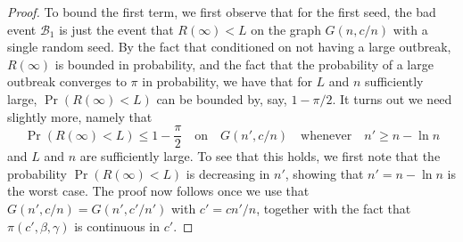 \documentclass[11pt]{article}
\begin{document}
\begin{proof}
  
To bound the first term, we
first observe that for the first seed, the bad event $\mathcal B_1$ is just the event that $R(\infty)<L$ on the graph $G(n,c/n)$ with a single random seed.  By the fact that conditioned on not having a large outbreak, 
$R(\infty)$ is bounded in probability, and the fact that the probability of a large outbreak converges to $\pi$ in probability, we have that for $L$ and $n$ sufficiently large, $\Pr(R(\infty)<L)$ can be bounded by, say, $1-\pi/2$.  It turns out we need slightly more, namely that
\begin{equation}\label{Rinfty-on-Gn'}
\Pr(R(\infty)<L)\leq 1-\frac \pi 2\quad\text{on}\quad G(n',c/n)\quad\text{whenever} \quad n'\geq n-\ln n
\end{equation}
and $L$ and $n$ are sufficiently large.  To see that this holds, we first note that the probability $\Pr(R(\infty)<L)$ is decreasing in $n'$, showing that $n'=n-\ln n$ is the worst case.  The proof now follows once we use that $G(n',c/n)=G(n',c'/n')$ with $c'=cn'/n$, together with the fact that $\pi(c',\beta,\gamma)$ is continuous in $c'$.



\end{proof}
\end{document}
